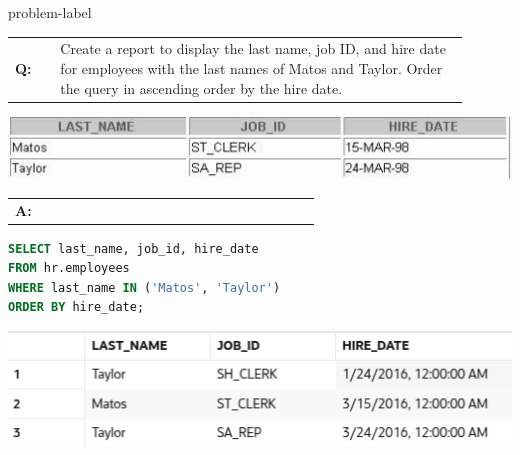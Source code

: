 \begin{problem}{}{problem-label}

\begin{tabular}{@{}l p{0.9\linewidth}@{}}
  \textbf{Q:} & Create a report to display the last name, job ID, and hire date for employees with the last names of Matos and Taylor. Order the query in ascending order by the hire date.
\end{tabular}

\begin{center}
  \includegraphics[scale=0.8]{images/c2q4.png}
\end{center}

\begin{tabular}{@{}l p{0.9\linewidth}@{}}
  \textbf{A:} & 
\end{tabular}

\begin{lstlisting}[language=SQL]
SELECT last_name, job_id, hire_date
FROM hr.employees
WHERE last_name IN ('Matos', 'Taylor')
ORDER BY hire_date;
\end{lstlisting}

\vspace{1em}

\begin{center}
  \includegraphics[scale=0.8]{images/c2a4.png}
\end{center}

\end{problem}

